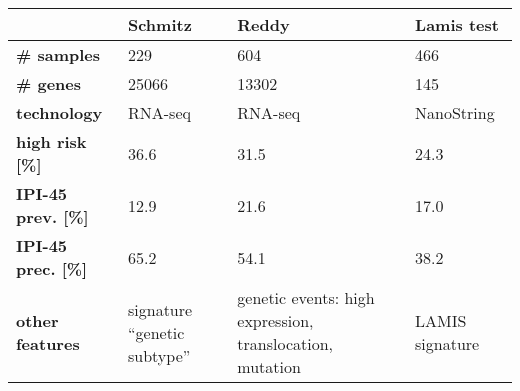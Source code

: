 \begin{table}[ht]
\small
\centering
\begin{tabular}{L{.18\textwidth}R{.2\textwidth}R{.28\textwidth}R{.18\textwidth}}
  \hline
  & \textbf{Schmitz \cite{schmitz18}} & \textbf{Reddy \cite{reddy17}} & \textbf{Lamis test \cite{staiger20}} \\
  \hline
  \textbf{\# samples} & \num{229} & \num{604} & \num{466} \\
  \textbf{\# genes} & \num{25066} & \num{13302} & \num{145} \\
  \textbf{technology} & RNA-seq & RNA-seq & NanoString \\
  \textbf{high risk [\%]} & \num{36.6} & \num{31.5}\footnotemark & \num{24.3} \\
  \textbf{IPI-45 prev. [\%]} & \num{12.9} & \num{21.6} & \num{17.0} \\
  \textbf{IPI-45 prec. [\%]} & \num{65.2} & \num{54.1} & \num{38.2} \\
  \textbf{other features\footnotemark} & signature ``genetic subtype'' & 
    genetic events: high expression, translocation, mutation & LAMIS signature \\
  \hline
\end{tabular}
\end{table}
